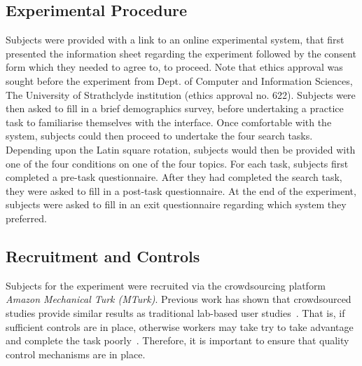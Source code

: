 
\subsection{Experimental Procedure}
Subjects were provided with a link to an online experimental system, that first presented the information sheet regarding the experiment followed by the consent form which they needed to agree to, to proceed. Note that ethics approval was sought before the experiment from Dept. of Computer and Information Sciences, The University of Strathclyde institution (ethics approval no. 622). Subjects were then asked to fill in a brief demographics survey, before undertaking a practice task to familiarise themselves with the interface. Once comfortable with the system, subjects could then proceed to undertake the four search tasks. Depending upon the Latin square rotation, subjects would then be provided with one of the four conditions on one of the four topics. For each task, subjects first completed a pre-task questionnaire. After they had completed the search task, they were asked to fill in a post-task questionnaire. At the end of the experiment, subjects were asked to fill in an exit questionnaire regarding which system they preferred.



\subsection{Recruitment and Controls}\label{sec:method:subjects}
Subjects for the experiment were recruited via the crowdsourcing platform \emph{Amazon Mechanical Turk (MTurk)}. Previous work has shown that crowdsourced studies provide similar results as traditional lab-based user studies~\cite{kelly2011remote,zuccon2013crowdsourcing}. That is, if sufficient controls are in place, otherwise workers may take try to take advantage and complete the task poorly~\cite{feild2010turkers,bota2016playing_your_cards}. Therefore, it is important to ensure that quality control mechanisms are in place. 

